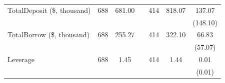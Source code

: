 \begin{table}[ht!]
\begin{tabular*}{\linewidth}{@{\extracolsep{\fill}}lcccccc }
    TotalDeposit (\$, thousand) & 688   & 681.00 &       & 414   & 818.07 & 137.07 \\
          &       &       &       &       &       & (148.10) \\
    TotalBorrow (\$, thousand) & 688   & 255.27 &       & 414   & 322.10 & 66.83 \\
          &       &       &       &       &       & (57.07) \\
    Leverage & 688   & 1.45  &       & 414   & 1.44  & 0.01 \\
          &       &       &       &       &       & (0.01) \\
    \bottomrule
          \end{tabular*} 



\end{table}%




